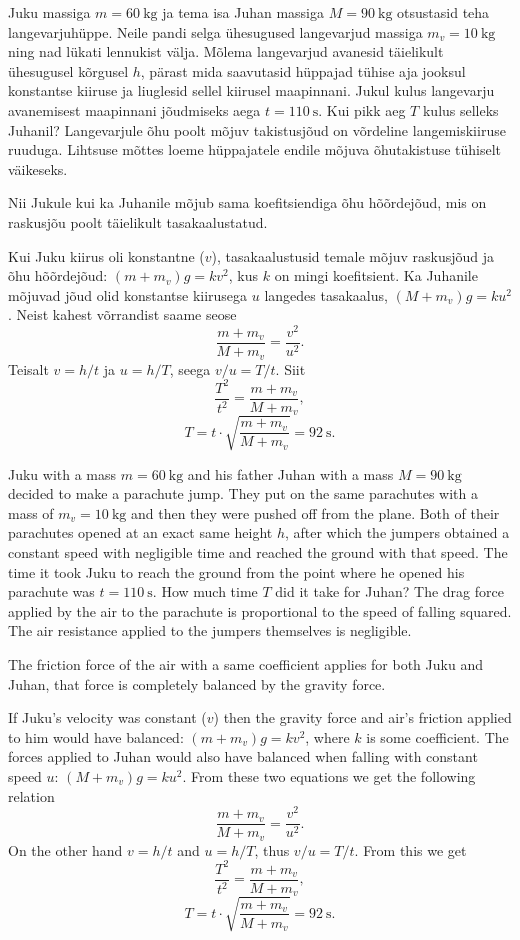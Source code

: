 
Juku massiga $m=\SI{60}{\kg}$ ja tema isa Juhan massiga $M=\SI{90}{\kg}$ otsustasid teha langevarjuhüppe. Neile pandi selga ühesugused langevarjud massiga $m_v=\SI{10}{\kg}$ ning nad lükati lennukist välja. Mõlema langevarjud avanesid täielikult ühesugusel kõrgusel $h$, pärast mida saavutasid hüppajad tühise aja jooksul konstantse kiiruse ja liuglesid sellel kiirusel maapinnani. Jukul kulus langevarju avanemisest maapinnani jõudmiseks aega $t=\SI{110}{\s}$. Kui pikk aeg $T$ kulus selleks Juhanil? Langevarjule õhu poolt mõjuv takistusjõud on võrdeline langemiskiiruse ruuduga. Lihtsuse mõttes loeme hüppajatele endile mõjuva õhutakistuse tühiselt väikeseks.

\hint
Nii Jukule kui ka Juhanile mõjub sama koefitsiendiga õhu hõõrdejõud, mis on raskusjõu poolt täielikult tasakaalustatud.

\solu
Kui Juku kiirus oli konstantne ($v$), tasakaalustusid temale mõjuv raskusjõud ja õhu hõõrdejõud: $(m+m_v)g=kv^2$, kus $k$ on mingi koefitsient. Ka Juhanile mõjuvad jõud olid konstantse kiirusega $u$ langedes tasakaalus, $(M+m_v)g=ku^2$. Neist kahest võrrandist saame seose \[\frac{m+m_v}{M+m_v}=\frac{v^2}{u^2}.\] Teisalt $v=h/t$ ja $u=h/T$, seega $v/u=T/t$. Siit
\[\frac{T^2}{t^2}=\frac{m+m_v}{M+m_v},\]
\[T=t \cdot \sqrt{\frac{m+m_v}{M+m_v}}=\SI{92}{\s}.\]

Juku with a mass $m=\SI{60}{\kg}$ and his father Juhan with a mass $M=\SI{90}{\kg}$ decided to make a parachute jump. They put on the same parachutes with a mass of $m_v=\SI{10}{\kg}$ and then they were pushed off from the plane. Both of their parachutes opened at an exact same height $h$, after which the jumpers obtained a constant speed with negligible time and reached the ground with that speed. The time it took Juku to reach the ground from the point where he opened his parachute was $t=\SI{110}{\s}$. How much time $T$ did it take for Juhan? The drag force applied by the air to the parachute is proportional to the speed of falling squared. The air resistance applied to the jumpers themselves is negligible.

\hinteng
The friction force of the air with a same coefficient applies for both Juku and Juhan, that force is completely balanced by the gravity force.

\solueng
If Juku’s velocity was constant ($v$) then the gravity force and air’s friction applied to him would have balanced: $(m+m_v)g=kv^2$, where $k$ is some coefficient. The forces applied to Juhan would also have balanced when falling with constant speed $u$: $(M+m_v)g=ku^2$. From these two equations we get the following relation
\[\frac{m+m_v}{M+m_v}=\frac{v^2}{u^2}.\]
On the other hand $v=h/t$ and $u=h/T$, thus $v/u=T/t$. From this we get
\[\frac{T^2}{t^2}=\frac{m+m_v}{M+m_v},\]
\[T=t \cdot \sqrt{\frac{m+m_v}{M+m_v}}=\SI{92}{\s}.\]
\probend